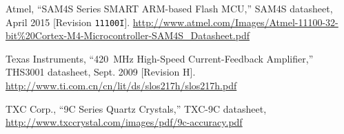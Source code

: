 \begin{thebibliography}{9}
%
%
%
Atmel, ``SAM4S Series SMART ARM-based Flash MCU,'' SAM4S datasheet, April 2015 [Revision \texttt{11100I}].
\url{http://www.atmel.com/Images/Atmel-11100-32-bit%20Cortex-M4-Microcontroller-SAM4S_Datasheet.pdf}

Texas Instruments, ``420~MHz High-Speed Current-Feedback Amplifier,''
THS3001 datasheet, Sept. 2009 [Revision H]. \url{http://www.ti.com.cn/cn/lit/ds/slos217h/slos217h.pdf}

TXC Corp., ``9C Series Quartz Crystals,'' TXC-9C datasheet, \url{http://www.txccrystal.com/images/pdf/9c-accuracy.pdf}

%
\end{thebibliography}
